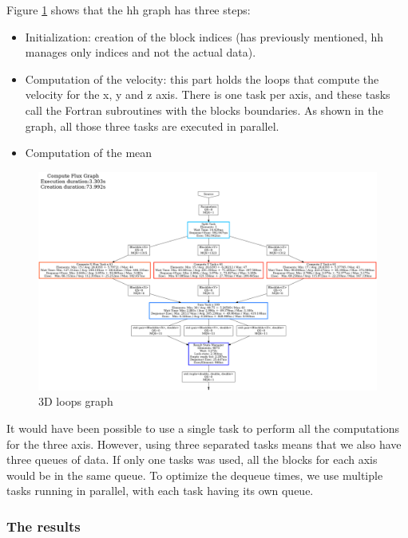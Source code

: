 Figure \ref{fig:loopsgraph} shows that the \gls{hh} graph has three steps:

\begin{itemize}
  \item Initialization: creation of the block indices (has previously
    mentioned, \gls{hh} manages only indices and not the actual data).
  \item Computation of the velocity: this part holds the loops that compute the
    velocity for the x, y and z axis. There is one task per axis, and these
    tasks call the Fortran subroutines with the blocks boundaries. As shown in
    the graph, all those three tasks are executed in parallel.
  \item Computation of the mean
\end{itemize}
\clearpage{}

\begin{figure}[h!]
  \begin{center}
    \includegraphics[scale=0.2]{img/fds-loops/graph-61.png}
    \caption{3D loops graph}
    \label{fig:loopsgraph}
  \end{center}
\end{figure}

It would have been possible to use a single task to perform all the computations
for the three axis. However, using three separated tasks means that we also have
three queues of data. If only one tasks was used, all the blocks for each axis
would be in the same queue. To optimize the dequeue times, we use multiple tasks
running in parallel, with each task having its own queue.

\subsubsection{The results}

